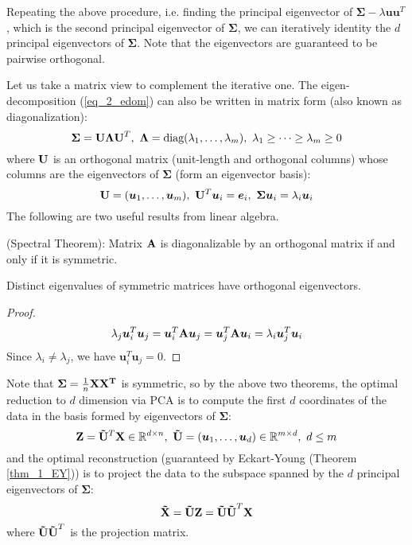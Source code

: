 \documentclass[../book-template.tex]{subfiles}
\begin{document}
\par Repeating the above procedure, i.e. finding the principal eigenvector of $\bm{\Sigma}-\lambda \bm{uu}^T$, which is the second principal eigenvector of $\bm{\Sigma}$, we can iteratively identity the $d$ principal eigenvectors of $\bm{\Sigma}$. Note that the eigenvectors are guaranteed to be pairwise orthogonal.
\par Let us take a matrix view to complement the iterative one. The eigen-decomposition (\ref{eq_2_edom}) can also be written in matrix form (also known as diagonalization):
\begin{equation*}
    {\bf \Sigma = U\Lambda U}^T,\ {\bf \Lambda} =\text{diag}(\lambda_1,\dots, \lambda_m),\ \lambda_1\geq\dots\geq\lambda_m\geq 0
\end{equation*}
where ${\bf U}$ is an orthogonal matrix (unit-length and orthogonal columns) whose columns are the eigenvectors of $\bm{\Sigma}$ (form an eigenvector basis):
\begin{equation*}
    {\bf U}=(\bm{u}_1,\dots,\bm{u}_m),\ {\bf U}^T\bm{u}_i=\bm{e}_i,\ \bm{\Sigma u}_i = \lambda_i\bm{u}_i
\end{equation*}
The following are two useful results from linear algebra.
\begin{theorem}\label{thm_2_spectral}
(Spectral Theorem): Matrix ${\bf A}$ is diagonalizable by an orthogonal matrix if and only if it is symmetric.
\end{theorem}
\begin{theorem}
Distinct eigenvalues of symmetric matrices have orthogonal eigenvectors.
\end{theorem}
\begin{proof}
\begin{equation*}
    \lambda_j \bm{u}_i^T\bm{u}_j = \bm{u}_i^T{\bf A}\bm{u}_j = \bm{u}_j^T{\bf A}\bm{u}_i = \lambda_i \bm{u}_j^T\bm{u}_i
\end{equation*}
Since $\lambda_i\neq \lambda_j$, we have $\bm{u}_i^T\bm{u}_j=0$.
\end{proof}
\vbox{}
\par Note that $\bm{\Sigma}=\frac{1}{n}{\bf XX^T}$ is symmetric, so by the above two theorems, the optimal reduction to $d$ dimension via PCA is to compute the first $d$ coordinates of the data in the basis formed by eigenvectors of $\bm{\Sigma}$:
\begin{equation*}
    {\bf Z}={\bf \tilde{U}}^T{\bf X}\in \mathbb{R}^{d\times n},\ {\bf \tilde{U}} = (\bm{u}_1,\dots,\bm{u}_d)\in\mathbb{R}^{m\times d},\ d\leq m
\end{equation*}
and the optimal reconstruction (guaranteed by Eckart-Young (Theorem \ref{thm_1_EY})) is to project the data to the subspace spanned by the $d$ principal eigenvectors of $\bm{\Sigma}$:
\begin{equation*}
    {\bf \tilde{X}}={\bf \tilde{U}Z} = {\bf \tilde{U}\tilde{U}}^T{\bf X}
\end{equation*}
where ${\bf \tilde{U}\tilde{U}}^T$ is the projection matrix.
\end{document}

